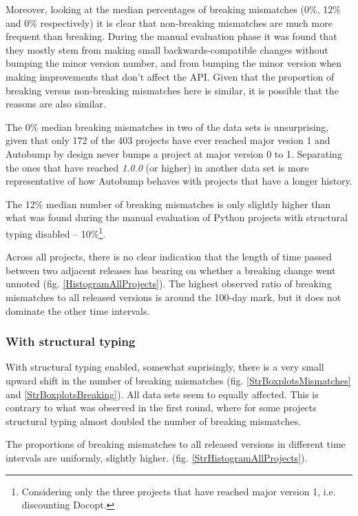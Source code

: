 \documentclass{l4proj}
\begin{document}
Moreover, looking at the median percentages of breaking mismatches
(0\%, 12\% and 0\% respectively) it is clear that non-breaking
mismatches are much more frequent than breaking. During the manual
evaluation phase it was found that they mostly stem from making small
backwards-compatible changes without bumping the minor version number,
and from bumping the minor version when making improvements that don't
affect the API. Given that the proportion of breaking versus
non-breaking mismatches here is similar, it is possible that the
reasons are also similar.

The 0\% median breaking mismatches in two of the data sets is
unsurprising, given that only 172 of the 403 projects have ever
reached major vesion 1 and Autobump by design never bumps a project at
major version 0 to 1. Separating the ones that have reached
\textit{1.0.0} (or higher) in another data set is more representative
of how Autobump behaves with projects that have a longer history.

The 12\% median number of breaking mismatches is only slightly higher
than what was found during the manual evaluation of Python projects
with structural typing disabled -- 10\%\footnote{Considering only the
three projects that have reached major version 1, i.e.
discounting Docopt.}.

Across all projects, there is no clear indication that the length of
time passed between two adjacent releases has bearing on whether a
breaking change went unnoted (fig. \ref{HistogramAllProjects}). The
highest observed ratio of breaking mismatches to all released versions
is around the 100-day mark, but it does not dominate the other time
intervals.

\subsubsection{With structural typing}

With structural typing enabled, somewhat suprisingly, there is a very
small upward shift in the number of breaking mismatches (fig.
\ref{StrBoxplotsMismatches} and \ref{StrBoxplotsBreaking}). All data
sets seem to equally affected. This is contrary to what was observed
in the first round, where for some projects structural typing almost
doubled the number of breaking mismatches.

The proportions of breaking mismatches to all released versions in
different time intervals are uniformly, slightly higher. (fig.
\ref{StrHistogramAllProjects}).
\end{document}
